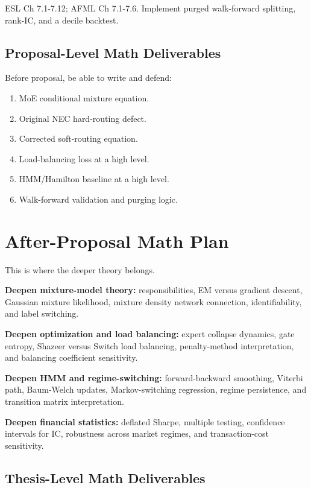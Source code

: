 \documentclass[11pt]{article}
\begin{document}
ESL Ch 7.1-7.12; AFML Ch 7.1-7.6. Implement purged walk-forward splitting, rank-IC, and a decile backtest.

\subsection{Proposal-Level Math Deliverables}

Before proposal, be able to write and defend:

\begin{enumerate}
  \item MoE conditional mixture equation.
  \item Original NEC hard-routing defect.
  \item Corrected soft-routing equation.
  \item Load-balancing loss at a high level.
  \item HMM/Hamilton baseline at a high level.
  \item Walk-forward validation and purging logic.
\end{enumerate}

\section{After-Proposal Math Plan}

This is where the deeper theory belongs.

\textbf{Deepen mixture-model theory:} responsibilities, EM versus gradient descent, Gaussian mixture likelihood, mixture density network connection, identifiability, and label switching.

\textbf{Deepen optimization and load balancing:} expert collapse dynamics, gate entropy, Shazeer versus Switch load balancing, penalty-method interpretation, and balancing coefficient sensitivity.

\textbf{Deepen HMM and regime-switching:} forward-backward smoothing, Viterbi path, Baum-Welch updates, Markov-switching regression, regime persistence, and transition matrix interpretation.

\textbf{Deepen financial statistics:} deflated Sharpe, multiple testing, confidence intervals for IC, robustness across market regimes, and transaction-cost sensitivity.

\subsection{Thesis-Level Math Deliverables}
\end{document}
